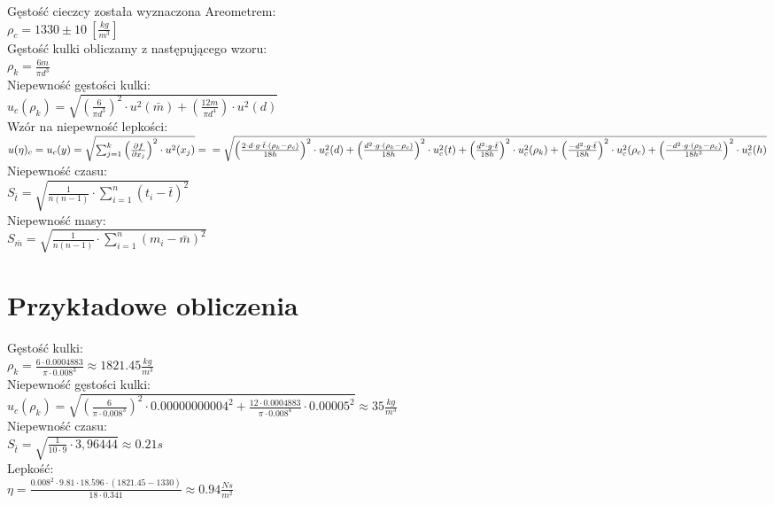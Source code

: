 \documentclass{article}
\begin{document}
\noindent
Gęstość cieczcy została wyznaczona Areometrem:\\
$\rho_{c}=1330 \pm10 \ \left[\frac{kg}{m^{3}}\right]$\\
Gęstość kulki obliczamy z następującego wzoru:\\
$\rho_{k}=\frac{6m}{\pi d^{3}}$\\
Niepewność gęstości kulki:\\
$u_{c}(\rho_{k})=\sqrt{\left(\frac{6}{\pi d^{3}}\right)^{2}\cdot u^{2}(\bar{m}) + \left(\frac{12m}{\pi d^{4}}\right)\cdot u^{2}(d)}$\\
Wzór na niepewność lepkości:\\
$u(\eta)_{c}=u_{c}(y)=\sqrt{\sum^{k}_{j=1}\left(\frac{\partial f}{\partial x_{j}}\right)^{2}\cdot u^{2}(x_{j})}=  \\= \sqrt{\left(\frac{ 2\cdot d\cdot g\cdot \bar{t}\cdot (\rho_{k}-\rho_{c})  }{ 18h  }\right)^{2}\cdot u_{c}^{2}( d  )+
\left(\frac{ d^{2}\cdot g\cdot (\rho_{k}-\rho_{c})  }{ 18h  }\right)^{2}\cdot u_{c}^{2}( t  )+
\left(\frac{ d^{2}\cdot g\cdot \bar{t}  }{ 18h  }\right)^{2}\cdot u_{c}^{2}( \rho_{k}  )+
\left(\frac{ -d^{2}\cdot g\cdot \bar{t}  }{ 18h  }\right)^{2}\cdot u_{c}^{2}( \rho_{c}  )+
\left(\frac{ -d^{2}\cdot g\cdot (\rho_{k}-\rho_{c})  }{ 18h^{2}  }\right)^{2}\cdot u_{c}^{2}( h  )   }$\\
\noindent
Niepewność czasu:\\
$S_{\bar{t}}=\sqrt{\frac{1}{n(n-1)}\cdot\sum^{n}_{i=1}\left(t_{i}-\bar{t}\right)^{2}}$\\
Niepewność masy:\\
$S_{\bar{m}}=\sqrt{\frac{1}{n(n-1)}\cdot\sum^{n}_{i=1}\left(m_{i}-\bar{m}\right)^{2}}$\\
\newpage
\section{Przykładowe obliczenia}
Gęstość kulki:\\
$\rho_{k}=\frac{6\cdot 0.0004883}{\pi\cdot0.008^{3}}\approx1821.45\frac{kg}{m^{3}}$\\
Niepewność gęstości kulki:\\
$u_{c}(\rho_{k})=\sqrt{\left(\frac{6}{\pi\cdot 0.008^{3}}\right)^{2}\cdot 0.00000000004^{2}+\frac{12\cdot 0.0004883}{\pi\cdot 0.008^{4}}\cdot 0.00005^{2}}\approx35\frac{kg}{m^{3}}$\\
Niepewność czasu:\\
$S_{\bar{t}}=\sqrt{\frac{1}{10\cdot 9}\cdot 3,96444}\approx0.21s$\\
Lepkość:\\
$\eta=\frac{0.008^{2}\cdot 9.81\cdot 18.596\cdot (1821.45-1330)}{18\cdot 0.341}\approx0.94\frac{Ns}{m^{2}}$\\
\end{document}
